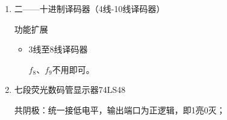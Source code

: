 \documentclass[UTF8,fontset=fandol,zihao=5]{ctexart}
\begin{document}
\begin{enumerate}
\begin{itemize}
    片Ⅰ的$S_\mathrm{B}$与片Ⅱ的$S_\mathrm{A}$并接在一起作为最高位$D$的输入端。
    片Ⅰ的$S_\mathrm{C}$与片Ⅱ的$S_\mathrm{B}$连在一起作为使能端。

    \item 6线至64线译码器（并行拓展）
    
    在8片74LS138的基础上添加1片74LS138作为高3位译码器，
    将其输出结果输入到8片74LS138的$S_\mathrm{B}$、$S_\mathrm{C}$端口。

    \item 地址译码器
    
    将地址低3位输入到$A_2\sim A_0$端，
    其他位输入到$S_\mathrm{A}$、$S_\mathrm{B}$、$S_\mathrm{C}$端口，
    保证始终正常工作。

    可以将所有1通过与门，所有0通过或门，接入使能端，即可实现地址译码器。

    \item 数据分配器
    
    将数据$D$输入到$S_\mathrm{B}$、$S_\mathrm{C}$端口。
    
    当$D=1$时，译码器所有端口输出1，数据分配器分配的数据必定是1；
    当$D=0$时，译码器对应端口输出0。

    \item 函数发生器
    
    可以将译码器的输出端看作$2^n$个最小项，可以通过基本逻辑门组合实现任意逻辑函数。
    
    注意：译码器为\textbf{负逻辑输出}！

    \begin{methodbox}[【技巧】最小项间转换]
        $m_0 + m_1 + m_2 = \overline{m_3}$
        
        运用此式可以化简逻辑函数，减少逻辑门数量。
    \end{methodbox}
  \end{itemize}

  \item 二——十进制译码器（4线-10线译码器）
  
  功能扩展
  \begin{itemize}
    \item 3线至8线译码器
    
    $f_8$、$f_9$不用即可。
  \end{itemize}

  \item 七段荧光数码管显示器74LS48
  
  \begin{methodbox}
    共阴极：统一接低电平，输出端口为正逻辑，即1亮0灭；


\end{methodbox}
\end{enumerate}
\end{document}

